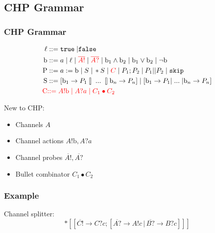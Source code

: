 \documentclass[compress]{beamer}
\begin{document}
\subsection{CHP Grammar}
\begin{frame}
    \frametitle{CHP Grammar}
    \begin{align*}
        \ell & ::= \mathtt{true} \; | \mathtt{false} \\
        \mathrm{b} & ::= a \; | \; \ell \; | \; {\color{red} \overline{A!}} \; | \; {\color{red} \overline{A?}} \; | \; \mathrm{b}_1 \wedge \mathrm{b}_2 \; | \; \mathrm{b}_1 \vee \mathrm{b}_2 \; | \; \lnot \mathrm{b} \\
        \mathrm{P} & ::= a := \mathrm{b} \; | \; S \; | \, *S \; | \; {\color{red} C} \; | \; P_1; P_2 \; | \: P_1 || P_2 \; | \; \mathtt{skip} \\
        \mathrm{S} & ::= [ \mathrm{b}_1 \rightarrow P_1 \talloblong \; ... \; \talloblong \mathrm{b}_n \rightarrow P_n ] \; | \; [ \mathrm{b}_1 \rightarrow P_1 | \; ... \; | \mathrm{b}_n \rightarrow P_n ] \\
        {\color{red} \mathrm{C}} & {\color{red} ::= A!\mathrm{b} \; | \; A?a \; | \; C_1 \bullet C_2}
    \end{align*}
\end{frame}
\begin{frame}
    New to CHP:
    \begin{itemize}
        \item Channels $A$
        \item Channel actions $A!\mathrm{b}, A?a$
        \item Channel probes $\overline{A!}, \overline{A?}$
        \item \color{lightgray} Bullet combinator $C_1 \bullet C_2$
    \end{itemize}
\end{frame}
\begin{frame}
    \frametitle{Example}
    Channel splitter:
    {\small $$*[[\overline{C!} \rightarrow C?c; [\overline{A?} \rightarrow A!c \, | \, \overline{B?} \rightarrow B?c]]]$$}
\end{frame}
\end{document}
